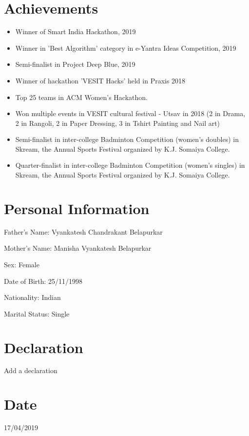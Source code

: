 \documentclass[margin]{res}
\begin{document}
\begin{resume}
\section{Achievements}
\begin{itemize}
\item Winner of Smart India Hackathon, 2019
\item Winner in 'Best Algorithm' category in e-Yantra Ideas Competition, 2019
\item Semi-finalist in Project Deep Blue, 2019
\item Winner of hackathon 'VESIT Hacks' held in Praxis 2018
\item Top 25 teams in ACM Women's Hackathon. 
\item Won multiple events in VESIT cultural festival - Utsav in 2018 (2 in Drama, 2 in Rangoli, 2 in Paper Dressing, 3 in Tshirt Painting and Nail art)
\item Semi-finalist in inter-college Badminton Competition (women's doubles) in Skream, the Annual Sports Festival organized by K.J. Somaiya College.
\item Quarter-finalist in inter-college Badminton Competition (women's singles) in Skream, the Annual Sports Festival organized by K.J. Somaiya College.
\end{itemize}

\section{Personal Information}
Father's Name: Vyankatesh Chandrakant Belapurkar

Mother's Name: Manisha Vyankatesh Belapurkar

Sex: Female

Date of Birth: 25/11/1998

Nationality: Indian

Marital Status: Single

\section{Declaration}
Add a declaration

\section{Date}
17/04/2019

\end{resume}
\end{document}
